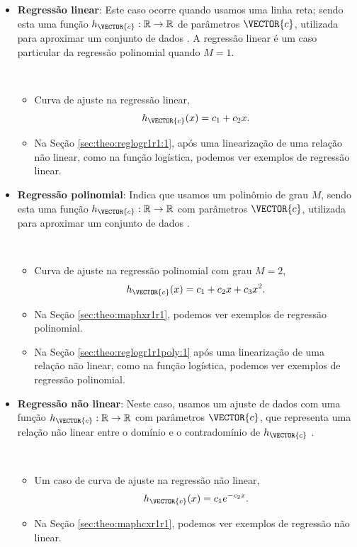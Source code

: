 \begin{itemize}
\item \textbf{Regressão linear}: 
Este caso ocorre quando usamos uma linha reta;
sendo esta uma função $h_{\VECTOR{c}}:\mathbb{R} \rightarrow \mathbb{R}$ de parâmetros $\VECTOR{c}$, 
utilizada para aproximar um conjunto de dados \cite[pp. 398, 402]{chapra2016metodos} \cite[pp. 25]{aster2013parameter}.
A regressão linear é um caso particular da regressão polinomial quando $M=1$.
\begin{example}~
\begin{itemize}
\item Curva de ajuste na regressão linear, 
\begin{equation}
h_{\VECTOR{c}}(x)=c_1+c_2 x.
\end{equation}
\item Na Seção \ref{sec:theo:reglogr1r1:1}, após uma linearização de uma relação não linear,
como na função logística, podemos ver exemplos de regressão linear.
\end{itemize}
\end{example}

\item \textbf{Regressão polinomial}: 
Indica que usamos um polinômio de grau $M$,
sendo esta uma função $h_{\VECTOR{c}}:\mathbb{R} \rightarrow \mathbb{R}$ com parâmetros $\VECTOR{c}$, 
utilizada para aproximar um conjunto de dados \cite[pp. 399, 415]{chapra2016metodos}.
\begin{example}~
\begin{itemize}
\item Curva de ajuste na regressão polinomial com grau $M=2$,
\begin{equation}
h_{\VECTOR{c}}(x)=c_1+c_2 x+c_3 x^2.
\end{equation}
\item Na Seção \ref{sec:theo:maphxr1r1}, podemos ver exemplos de regressão polinomial.
\item Na Seção \ref{sec:theo:reglogr1r1poly:1} após uma linearização de uma relação não linear,
como na função logística, podemos ver exemplos de regressão polinomial.
\end{itemize}
\end{example}

\item \textbf{Regressão não linear}: 
Neste caso, usamos um ajuste de dados
com uma função $h_{\VECTOR{c}}:\mathbb{R} \rightarrow \mathbb{R}$ com parâmetros $\VECTOR{c}$, 
que representa uma relação não linear entre o domínio e o contradomínio de $h_{\VECTOR{c}}$ 
\cite[pp. 424]{chapra2016metodos} \cite[pp. 217]{agarwal2014creators}.
\begin{example}~
\begin{itemize}
\item Um caso de curva de ajuste na regressão não linear, 
\begin{equation}
h_{\VECTOR{c}}(x)=c_1 e^{-c_2 x}.
\end{equation}
\item Na Seção \ref{sec:theo:maphcxr1r1}, podemos ver exemplos de regressão não linear.
\end{itemize}
\end{example}


\end{itemize}
